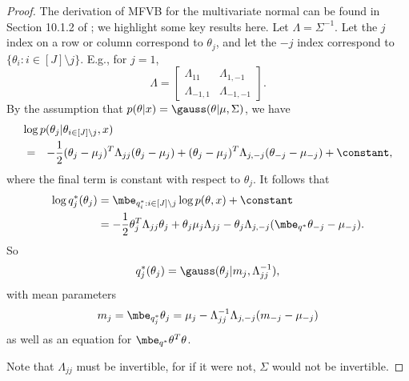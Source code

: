 \begin{proof}
  The derivation of MFVB for the multivariate normal can be found in Section
  10.1.2 of \cite{bishop:2006:pattern}; we highlight some key results here. Let
  $\Lambda = \Sigma^{-1}$. Let the $j$ index on a row or column correspond to
  $\theta_j$, and let the $-j$ index correspond to $\{\theta_{i}: i \in
  [J]\setminus j\}$. E.g., for $j=1$,
  $$
    \Lambda
      = \left[ \begin{array}{ll}
          \Lambda_{11} & \Lambda_{1,-1} \\
          \Lambda_{-1,1} & \Lambda_{-1,-1}
        \end{array} \right].
  $$
  By the assumption that $p(\theta | x) = \gauss(\theta | \mu, \Sigma)$, we have
\begin{eqnarray}\label{eq:mvn_variational_dist}
  \lefteqn{\log p(\theta_{j} | \theta_{i \in [J]\setminus j}, x)} \nonumber\\
      &=& -\frac{1}{2} (\theta_{j} - \mu_{j})^{T} \Lambda_{jj} (\theta_j - \mu_j) +
         (\theta_{j} - \mu_{j})^{T} \Lambda_{j,-j} (\theta_{-j} - \mu_{-j}) + \constant,
\end{eqnarray}
%
  where the final term is constant with respect to $\theta_{j}$.
  It follows that
  \begin{align*}
    \log q^{*}_{j}(\theta_j)
      &= \mbe_{q^{*}_{i}: i \in [J]\setminus j} \log p(\theta, x) + \constant \\
      &= -\frac{1}{2} \theta_{j}^{T} \Lambda_{jj} \theta_j + \theta_j \mu_j \Lambda_{jj} - \theta_j \Lambda_{j,-j} (\mbe_{q^{*}} \theta_{-j} - \mu_{-j}).
  \end{align*}
  So
  \begin{equation*}
    q^*_j(\theta_j) = \gauss(\theta_j | m_{j}, \Lambda_{jj}^{-1}),
  \end{equation*}
  with mean parameters
  \begin{equation} \label{eq:mvn_stable_point}
    m_{j} = \mbe_{q^{*}_j} \theta_j = \mu_{j} - \Lambda_{jj}^{-1} \Lambda_{j,-j} (m_{-j} - \mu_{-j})
  \end{equation}
  as well as an equation for $\mbe_{q^{*}} \theta^T \theta$.

Note that $\Lambda_{jj}$ must be invertible, for if it were not, $\Sigma$ would
not be invertible.


\end{proof}
